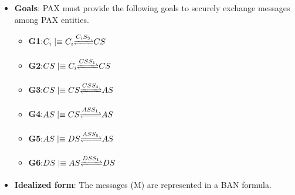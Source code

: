 \documentclass[journal,article,submit,moreauthors,pdftex]{Definitions/mdpi}
\begin{document}
\begin{itemize}
\item \textbf{Goals}: PAX must provide the following goals to securely exchange messages among PAX entities.

\begin{varwidth}{1.5\textwidth}
\begin{itemize}
 \scriptsize
\item \textbf{G1}:$C_i \mid\equiv C_i {\xrightleftharpoons{C_iS_3}} CS$
\item \textbf{G2}:$CS \mid\equiv C_i {\xrightleftharpoons{CSS_1}} CS$
\item \textbf{G3}:$CS \mid\equiv CS {\xrightleftharpoons{CSS_4}} AS$
\end{itemize}
\end{varwidth}
\hspace{4em}
\begin{varwidth}{.5\textwidth}
\begin{itemize}
 \scriptsize
\item \textbf{G4}:$AS \mid\equiv CS {\xrightleftharpoons{ASS_1}} AS$
\item \textbf{G5}:$AS \mid\equiv DS {\xrightleftharpoons{ASS_5}} AS$
\item \textbf{G6}:$DS \mid\equiv AS {\xrightleftharpoons{DSS_1}} DS$
\end{itemize}
\end{varwidth}
\vspace{2mm}
\item \textbf{Idealized form}: The messages (M) are represented in a BAN formula.
 \begin{itemize}
   \scriptsize
\end{itemize}
\end{itemize}
\end{document}
